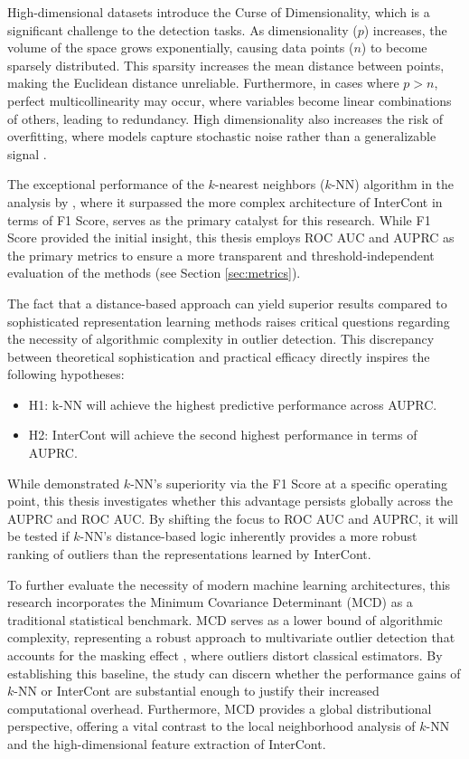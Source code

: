 High-dimensional datasets introduce the Curse of Dimensionality, which is a significant challenge to the detection tasks. 
As dimensionality ($p$) increases, the volume of the space grows exponentially, causing data points ($n$) to become sparsely distributed. 
This sparsity increases the mean distance between points, making the Euclidean distance unreliable. 
Furthermore, in cases where $p > n$, perfect multicollinearity may occur, where variables become linear combinations of others, leading to redundancy. 
High dimensionality also increases the risk of overfitting, where models capture stochastic noise rather than a generalizable signal \citep{altman2018curse}.


The exceptional performance of the $k$-nearest neighbors ($k$-NN) algorithm in the analysis by \citet{shenkar2022anomaly}, where it surpassed the more complex architecture of InterCont in terms of F1 Score, serves as the primary catalyst for this research. 
While F1 Score provided the initial insight, this thesis employs ROC AUC and AUPRC as the primary metrics to ensure a more transparent and threshold-independent evaluation of the methods (see Section \ref{sec:metrics}).


The fact that a distance-based approach can yield superior results compared to sophisticated representation learning methods raises critical questions regarding the necessity of algorithmic complexity in outlier detection. 
This discrepancy between theoretical sophistication and practical efficacy directly inspires the following hypotheses:


\begin{itemize}
    \item H1: k-NN will achieve the highest predictive performance across AUPRC.
    \item H2: InterCont will achieve the second highest performance in terms of AUPRC.
\end{itemize}


While \citet{shenkar2022anomaly} demonstrated $k$-NN's superiority via the F1 Score at a specific operating point, this thesis investigates whether this advantage persists globally across the AUPRC and ROC AUC. 
By shifting the focus to ROC AUC and AUPRC, it will be tested if $k$-NN's distance-based logic inherently provides a more robust ranking of outliers than the representations learned by InterCont.


To further evaluate the necessity of modern machine learning architectures, this research incorporates the Minimum Covariance Determinant (MCD) as a traditional statistical benchmark. 
MCD serves as a lower bound of algorithmic complexity, representing a robust approach to multivariate outlier detection that accounts for the masking effect \citep{hardin2005distribution}, where outliers distort classical estimators. 
By establishing this baseline, the study can discern whether the performance gains of $k$-NN or InterCont are substantial enough to justify their increased computational overhead. 
Furthermore, MCD provides a global distributional perspective, offering a vital contrast to the local neighborhood analysis of $k$-NN and the high-dimensional feature extraction of InterCont.



